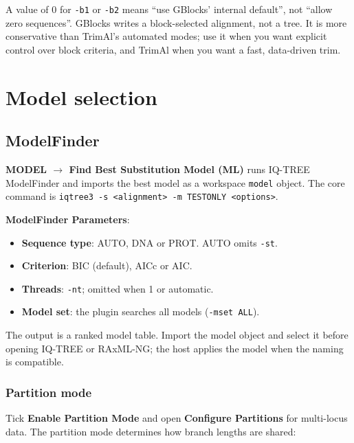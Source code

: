 \documentclass[10pt]{report}
\begin{document}
A value of 0 for \texttt{-b1} or \texttt{-b2} means ``use GBlocks' internal
default'', not ``allow zero sequences''. GBlocks writes a block-selected
alignment, not a tree. It is more conservative than TrimAl's automated modes;
use it when you want explicit control over block criteria, and TrimAl when you
want a fast, data-driven trim.

\chapter{Model selection}

\section{ModelFinder}

\textbf{MODEL $\rightarrow$ Find Best Substitution Model (ML)} runs IQ-TREE
ModelFinder \cite{modelfinder} and imports the best model as a workspace
\texttt{model} object.
The core command is \texttt{iqtree3 -s <alignment> -m TESTONLY <options>}.

\textbf{ModelFinder Parameters}:

\begin{itemize}
  \item \textbf{Sequence type}: AUTO, DNA or PROT. AUTO omits \texttt{-st}.
  \item \textbf{Criterion}: BIC (default), AICc or AIC.
  \item \textbf{Threads}: \texttt{-nt}; omitted when 1 or automatic.
  \item \textbf{Model set}: the plugin searches all models
        (\texttt{-mset ALL}).
\end{itemize}

The output is a ranked model table. Import the model object and select it
before opening IQ-TREE or RAxML-NG; the host applies the model when the naming
is compatible.

\subsection{Partition mode}

Tick \textbf{Enable Partition Mode} and open \textbf{Configure Partitions} for
multi-locus data. The partition mode determines how branch lengths are shared:
\end{document}

